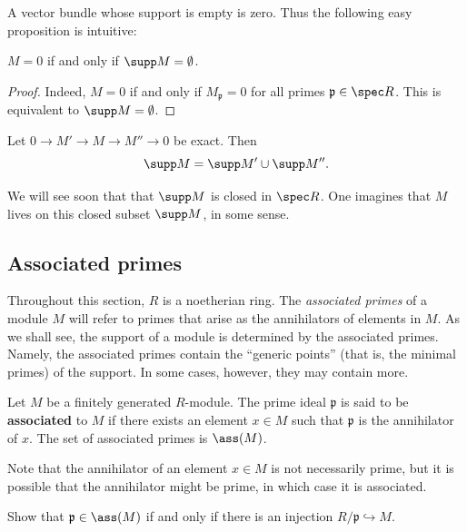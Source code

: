 A vector bundle whose support is empty is zero. Thus the following easy
proposition is intuitive:

\begin{proposition} 
$M = 0$ if and only if $\supp M = \emptyset$. 
\end{proposition}
\begin{proof} 
Indeed, $M=0$ if and only if $M_{\mathfrak{p}} = 0$ for all primes
$\mathfrak{p} \in \spec R$. This is equivalent to $\supp M = \emptyset$.
\end{proof} 
 
\begin{exercise} 
Let $0 \to M' \to M \to M'' \to 0$ be exact. Then 
\[ \supp M = \supp M' \cup \supp M''.  \]
\end{exercise} 


We will see soon that that $\supp M$ is closed in $\spec R$. One imagines that
$M$ lives on this closed subset $\supp M$, in some sense.



\subsection{Associated primes}
Throughout this section, $R$ is a noetherian ring. The \emph{associated
primes} of a module $M$ will refer to primes that arise as the annihilators of
elements in $M$. As we shall see, the support of  a module is determined by
the associated primes. Namely, the associated primes contain the ``generic
points'' (that is, the minimal primes) of the support. In some cases, however,
they may contain more. 


\begin{definition} 
Let $M$ be a finitely generated $R$-module.  The prime ideal $\mathfrak{p}$ is said to be
\textbf{associated} to $M$ if there exists an element $x \in M$ such that
$\mathfrak{p}$ is the annihilator of $x$.  The set of associated primes is
$\ass(M)$.
\end{definition} 

Note that the annihilator of an element $x \in M$ is not necessarily prime, but
it is possible that the annihilator might be prime, in which case it is
associated.

\begin{exercise} 
Show that $\mathfrak{p} \in \ass(M)$ if and only if there is an injection
$R/\mathfrak{p} \hookrightarrow M$.
\end{exercise} 

